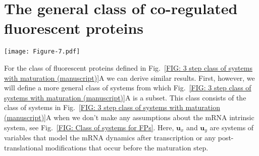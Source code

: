 \documentclass[%
 reprint,prx,
superscriptaddress,
%
%
%
%
%
%
%
%
%
 amsmath,amssymb,
 aps,
%
%
%
%
%
%
]{revtex4-2}
\begin{document}
\section{The general class of co-regulated fluorescent proteins}
\label{SEC: General class of fluorescent proteins}
\begin{figure*}[hbt!]
\vspace{-0.5cm}
\centering
  \texttt{[image: Figure-7.pdf]}
   \caption{
    \textbf{General class of dual reporter systems with co-regulated fluorescent proteins} 
    We consider a class of systems identical to Fig.~\ref{FIG: 3 step class of systems with maturation (manuscript)}A with the exception that we now include multiple unspecified steps in the intrinsic dynamics of gene expression. 
    Here $\mathbf{u}_{x}$ and $\mathbf{u}_{y}$ are identical (though independent) systems of components that are affected by the upstream cloud of components $\mathbf{u}(t)$ in the same way.
    These two smaller clouds of components model the intrinsic steps in gene expression and allow for a wide range of possible mRNA dynamics {and post-translational modifications that occur before the maturation step. They are left unspecified except for the fact that we assume they do not form circuits of components that can create oscillations, so that any oscillatory variability is caused by the shared environment $\mathbf{u}(t)$.}
    We model the dynamics of immature fluorescent proteins denoted as X' and Y', as well as mature fluorescent proteins X'' and Y''. The birthrate of X' and Y' can now depend on the components in $\mathbf{u}_{x}$ and $\mathbf{u}_{y}$ respectively, in an arbitrary way. The asymmetry between the co-regulated genes is characterized by the ratio of average fluorescent maturation times $T_\mathrm{m} := \tau_{\mathrm{mat},y} / \tau_{\mathrm{mat},x}$. }
    \label{FIG: Class of systems for FPs}
\end{figure*}
For the class of fluorescent proteins defined in Fig.~\ref{FIG: 3 step class of systems with maturation (manuscript)}A we can derive similar results. First, however, we will define a more general class of systems from which 
Fig.~\ref{FIG: 3 step class of systems with maturation (manuscript)}A is a subset. This class consists of the class of systems in Fig.~\ref{FIG: 3 step class of systems with maturation (manuscript)}A when we don't make any assumptions about the mRNA intrinsic system, see Fig.~\ref{FIG: Class of systems for FPs}.
Here, $\mathbf{u}_x$ and $\mathbf{u}_y$ are systems of variables that model the mRNA dynamics after transcription {or any post-translational modifications that occur before the maturation step}.
\end{document}
